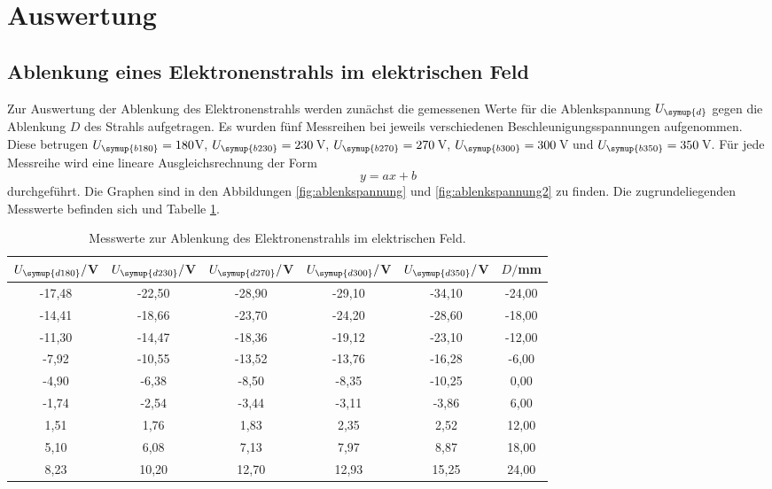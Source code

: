 \section{Auswertung}
\label{sec:Auswertung}


\subsection{Ablenkung eines Elektronenstrahls im elektrischen Feld}
\label{subsec:efeld}


Zur Auswertung der Ablenkung des Elektronenstrahls werden zunächst die gemessenen Werte
für die Ablenkspannung $U_{\symup{d}}$ gegen die Ablenkung $D$ des Strahls aufgetragen.
Es wurden fünf Messreihen bei jeweils verschiedenen Beschleunigungsspannungen aufgenommen.
Diese betrugen $U_{\symup{b180}}=180$V, $U_{\symup{b230}}=230\,$V, $U_{\symup{b270}}=270\,$V,
$U_{\symup{b300}}=300\,$V und $U_{\symup{b350}}=350\,$V.
Für jede Messreihe wird eine lineare Ausgleichsrechnung der Form
\begin{equation*}
  y=a x + b
\end{equation*}
durchgeführt. Die Graphen sind in den Abbildungen \ref{fig:ablenkspannung} und
\ref{fig:ablenkspannung2} zu finden. Die zugrundeliegenden Messwerte befinden sich
und Tabelle \ref{tab:elektrisch}.

\begin{table}[h]
	\begin{center}
    \caption{Messwerte zur Ablenkung des Elektronenstrahls im elektrischen Feld.}
    \label{tab:elektrisch}
		\begin{tabular}{cccccc}
		\toprule
			{$U_{\symup{d180}}/$V} & {$U_{\symup{d230}}/$V} & {$U_{\symup{d270}}/$V} & {$U_{\symup{d300}}/$V} & {$U_{\symup{d350}}/$V} & {$D/$mm}\\
			\midrule
			-17,48 & -22,50 & -28,90 & -29,10 & -34,10 & -24,00\\
			-14,41 & -18,66 & -23,70 & -24,20 & -28,60 & -18,00\\
			-11,30 & -14,47 & -18,36 & -19,12 & -23,10 & -12,00\\
			-7,92 & -10,55 & -13,52 & -13,76 & -16,28 & -6,00\\
			-4,90 & -6,38 & -8,50 & -8,35 & -10,25 & 0,00\\
			-1,74 & -2,54 & -3,44 & -3,11 & -3,86 & 6,00\\
			1,51 & 1,76 & 1,83 & 2,35 & 2,52 & 12,00\\
			5,10 & 6,08 & 7,13 & 7,97 & 8,87 & 18,00\\
			8,23 & 10,20 & 12,70 & 12,93 & 15,25 & 24,00\\
		\bottomrule
		\end{tabular}
	\end{center}
\end{table}

